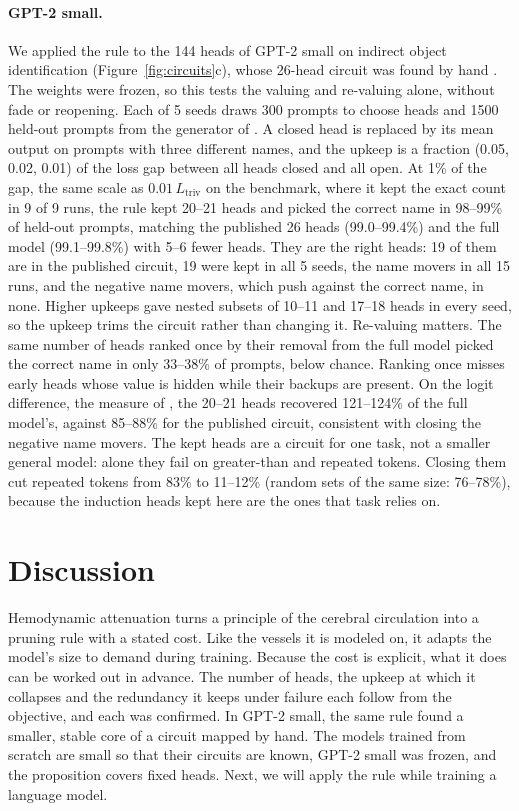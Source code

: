\documentclass[letterpaper]{article} %
\newcommand{\Ltriv}{L_{\mathrm{triv}}}
\begin{document}
\paragraph{GPT-2 small.} We applied the rule to the 144 heads of GPT-2 small on indirect object identification (Figure~\ref{fig:circuits}c), whose 26-head circuit was found by hand \citep{wang2023interpretability}. The weights were frozen, so this tests the valuing and re-valuing alone, without fade or reopening. Each of 5 seeds draws 300 prompts to choose heads and 1500 held-out prompts from the generator of \citet{wang2023interpretability}. A closed head is replaced by its mean output on prompts with three different names, and the upkeep is a fraction (0.05, 0.02, 0.01) of the loss gap between all heads closed and all open. At 1\% of the gap, the same scale as $0.01\,\Ltriv$ on the benchmark, where it kept the exact count in 9 of 9 runs, the rule kept 20--21 heads and picked the correct name in 98--99\% of held-out prompts, matching the published 26 heads (99.0--99.4\%) and the full model (99.1--99.8\%) with 5--6 fewer heads. They are the right heads: 19 of them are in the published circuit, 19 were kept in all 5 seeds, the name movers in all 15 runs, and the negative name movers, which push against the correct name, in none. Higher upkeeps gave nested subsets of 10--11 and 17--18 heads in every seed, so the upkeep trims the circuit rather than changing it. Re-valuing matters. The same number of heads ranked once by their removal from the full model picked the correct name in only 33--38\% of prompts, below chance. Ranking once misses early heads whose value is hidden while their backups are present. On the logit difference, the measure of \citet{wang2023interpretability}, the 20--21 heads recovered 121--124\% of the full model's, against 85--88\% for the published circuit, consistent with closing the negative name movers. The kept heads are a circuit for one task, not a smaller general model: alone they fail on greater-than and repeated tokens. Closing them cut repeated tokens from 83\% to 11--12\% (random sets of the same size: 76--78\%), because the induction heads kept here are the ones that task relies on.

\section{Discussion}

Hemodynamic attenuation turns a principle of the cerebral circulation into a pruning rule with a stated cost. Like the vessels it is modeled on, it adapts the model's size to demand during training. Because the cost is explicit, what it does can be worked out in advance. The number of heads, the upkeep at which it collapses and the redundancy it keeps under failure each follow from the objective, and each was confirmed. In GPT-2 small, the same rule found a smaller, stable core of a circuit mapped by hand. The models trained from scratch are small so that their circuits are known, GPT-2 small was frozen, and the proposition covers fixed heads. Next, we will apply the rule while training a language model.
\end{document}
